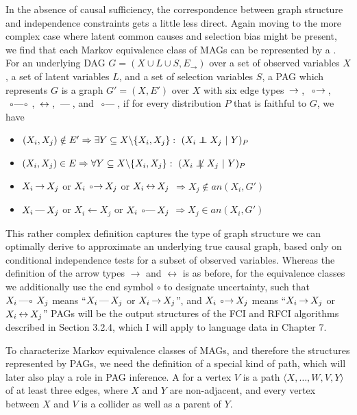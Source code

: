 In the absence of causal sufficiency, the correspondence between graph structure and independence constraints gets a little less direct. Again moving to the more complex case where latent common causes and selection bias might be present, we find that each Markov equivalence class of MAGs can be represented by a \textit{}. For an underlying DAG $G = (X \cup L \cup S,E_\rightarrow)$ over a set of observed variables $X$, a set of latent variables $L$, and a set of selection variables $S$, a PAG which represents $G$ is a graph $G' = (X, E')$ over $X$ with six edge types $\arrowLA$, $\arrowOA$, $\arrowOO$, $\arrowAA$, $\arrowLL$, and $\arrowOL$, if for every distribution $P$ that is faithful to $G$, we have
\begin{itemize}
 \item $(X_i,X_j) \notin E' \Rightarrow \exists Y \subseteq X \backslash \{X_i,X_j\}:\ (X_i \indep X_j\ |\ Y)_P$
 \item $(X_i,X_j) \in E \Rightarrow \forall Y \subseteq X \backslash \{X_i,X_j\}:\ (X_i \notindep X_j\ |\ Y)_P$
 \item $X_i \arrowLA X_j$ or $X_i \arrowOA X_j$ or $X_i \arrowAA X_j$ $\Rightarrow X_j \notin an(X_i,G')$
 \item $X_i \arrowLL X_j$ or $X_i \leftarrow X_j$ or $X_i \arrowOL X_j$ $\Rightarrow X_j \in an(X_i,G')$
\end{itemize}
This rather complex definition captures the type of graph structure we can optimally derive to approximate an underlying true causal graph, based only on conditional independence tests for a subset of observed variables. Whereas the definition of the arrow types $\rightarrow$ and $\leftrightarrow$ is as before, for the equivalence classes we additionally use the end symbol $\circ$ to designate uncertainty, such that $X_i \arrowLO X_j$ means ``$X_i \arrowLL X_j$ or $X_i \arrowLA X_j$'', and $X_i \arrowOA X_j$ means ``$X_i \arrowLA X_j$ or $X_i \arrowAA X_j$'' PAGs will be the output structures of the FCI and RFCI algorithms described in Section 3.2.4, which I will apply to language data in Chapter 7.

To characterize Markov equivalence classes of MAGs, and therefore the structures represented by PAGs, we need the definition of a special kind of path, which will later also play a role in PAG inference. A \textit{} for a vertex $V$ is a path $\langle X, \dots, W, V, Y \rangle$ of at least three edges, where $X$ and $Y$ are non-adjacent, and every vertex between $X$ and $V$ is a collider as well as a parent of $Y$.

